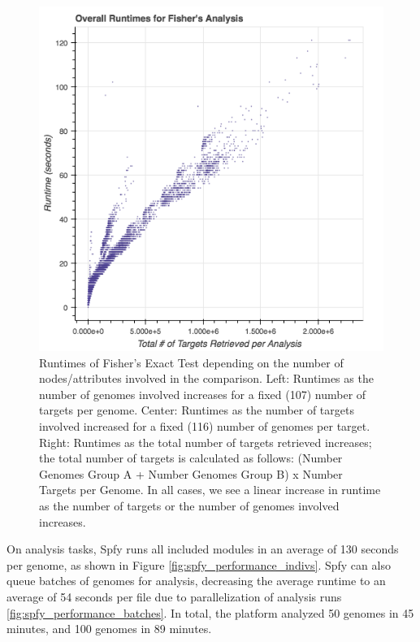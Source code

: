 \documentclass{article}
\begin{document}
\begin{figure}[!htb]
\endminipage\hfill
{}%
  \includegraphics[width=\linewidth]{images/fishers_overall.png}
\endminipage
\caption{Runtimes of Fisher's Exact Test depending on the number of nodes/attributes involved in the comparison. Left: Runtimes as the number of genomes involved increases for a fixed (107) number of targets per genome. Center: Runtimes as the number of targets involved increased for a fixed (116) number of genomes per target. Right: Runtimes as the total number of targets retrieved increases; the total number of targets is calculated as follows: (Number Genomes Group A + Number Genomes Group B) x Number Targets per Genome. In all cases, we see a linear increase in runtime as the number of targets or the number of genomes involved increases.}\label{fig:fishers_performance}
\end{figure}

On analysis tasks, Spfy runs all included modules in an average of 130 seconds per genome, as shown in Figure \ref{fig:spfy_performance_indivs}.
Spfy can also queue batches of genomes for analysis, decreasing the average runtime to an average of 54 seconds per file due to parallelization of analysis runs \ref{fig:spfy_performance_batches}.
In total, the platform analyzed 50 genomes in 45 minutes, and 100 genomes in 89 minutes.
\end{document}
